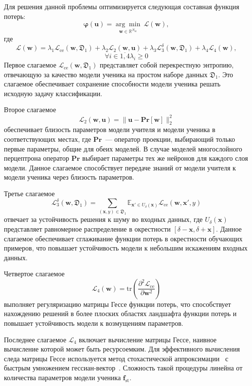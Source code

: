 Для решения данной проблемы оптимизируется следующая составная функция потерь:
\begin{equation}\label{phi}
  \boldsymbol{\varphi}(\mathbf{u}) = \underset{\mathbf{w} \in \mathbb{R}^{N_\text{st}}}{\arg\min}~\mathcal{L}(\mathbf{w}),
\end{equation}
где
\[
    \mathcal{L}(\mathbf{w}) = \lambda_1 \mathcal{L}_\text{ce}(\mathbf{w}, \mathfrak{D}_1) + \lambda_2 \mathcal{L}_2 (\mathbf{w}, \mathbf{u}) + \lambda_3 \mathcal{L}_3^\delta (\mathbf{w}, \mathfrak{D}_1) + \lambda_4 \mathcal{L}_4 (\mathbf{w}),
\]
\[
    \forall i \in \overline{1, 4}  \lambda_i \ge 0
\]
Первое слагаемое $\mathcal{L}_\text{ce}(\mathbf{w}, \mathfrak{D}_1)$ представляет собой перекрестную энтропию, отвечающую за качество модели ученика на простом наборе данных $\mathfrak{D}_1$. Это слагаемое обеспечивает сохранение способности модели ученика решать исходную задачу классификации.

Второе слагаемое
\[
    \mathcal{L}_2 (\mathbf{w}, \mathbf{u}) = \|\textbf{u} - \textbf{Pr}[\textbf{w}]\|^2_2
\]
обеспечивает близость параметров модели учителя и модели ученика в соответствующих местах, где $\textbf{Pr}$~--- оператор проекции, выбирающий только первые параметры, общие для обеих моделей. В случае моделей многослойного перцептрона оператор $\textbf{Pr}$ выбирает параметры тех же нейронов для каждого слоя модели. Данное слагаемое способствует передаче знаний от модели учителя к модели ученика через близость параметров.

Третье слагаемое
\[
    \mathcal{L}_3^\delta (\mathbf{w}, \mathfrak{D}_1) = \displaystyle \sum \limits_{(\textbf{x}, y) \in \mathfrak{D}_1} \displaystyle \mathbb{E}_{\textbf{x}' \in U_\delta(\textbf{x})} \mathcal{L}_\text{ce}(\mathbf{w}, \textbf{x}', y)
\]
отвечает за устойчивость решения к шуму во входных данных, где $U_\delta(\textbf{x})$ представляет равномерное распределение в окрестности $[\delta - \textbf{x}, \delta + \textbf{x}]$. Данное слагаемое обеспечивает сглаживание функции потерь в окрестности обучающих примеров, что повышает устойчивость модели к небольшим искажениям входных данных.

Четвертое слагаемое
\[
    \mathcal{L}_4 (\mathbf{w}) = \text{tr} \left(\displaystyle \frac{\partial^2 \mathcal{L}_\text{ce}}{\partial \mathbf{w}^2}\right)
\]
выполняет регуляризацию матрицы Гессе функции потерь, что способствует нахождению решений в более плоских областях ландшафта функции потерь и повышает устойчивость модели к возмущениям параметров.

Последнее слагаемое $\mathcal{L}_4$ включает вычисление матрицы Гессе, наивное вычисление которой может быть ресурсоемким.
Для эффективного вычисления следа матрицы Гессе используется метод стохастической аппроксимации~\cite{bai1996some} с быстрым умножением гессиан-вектор~\cite{pearlmutter1994fast}. Сложность такой процедуры линейна от количества параметров модели ученика $\mathbf{f}_\text{st}$.

